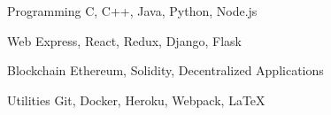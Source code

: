 
\vspace{-0.3cm}


\begin{cvskills}


  \cvskill
  {Programming}
  {C, C++, Java, Python, Node.js}


  \cvskill
  {Web}
  {Express, React, Redux, Django, Flask}


  \cvskill
  {Blockchain}
  {Ethereum, Solidity, Decentralized Applications}


  \cvskill
  {Utilities}
  {Git, Docker, Heroku, Webpack, \LaTeX}


\end{cvskills}


